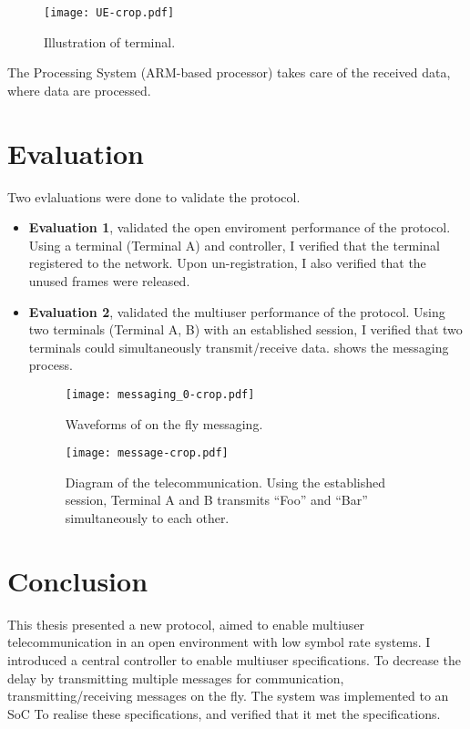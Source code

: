 ﻿\documentclass[twocolumn,9pt]{ltjsarticle}
\renewcommand{\ref}{\Cref}
\begin{document}
\begin{figure}[tb]
  \centering
  \texttt{[image: UE-crop.pdf]}
  \caption{\label{fig:terminal}
    Illustration of terminal.
  }
\end{figure}

The Processing System (ARM\textregistered -based processor) takes care of the received data, where data are processed.

\section{Evaluation}
Two evlaluations were done to validate the protocol.
\begin{itemize}
\item \textbf{Evaluation 1}, validated the open enviroment performance of the protocol.
  Using a terminal (Terminal A) and controller, I verified that the terminal registered to the network.
  Upon un-registration, I also verified that the unused frames were released.
\item \textbf{Evaluation 2}, validated the multiuser performance of the protocol.
  Using two terminals (Terminal A, B) with an established session, I verified that two terminals could simultaneously transmit/receive data.
  \ref{fig:message} shows the messaging process.

    \begin{figure*}[!tb]
      \centering
      \texttt{[image: messaging\_0-crop.pdf]}
      \caption{\label{fig:messaging}
        Waveforms of on the fly messaging.
      }
    \end{figure*}    
  
    \begin{figure}[tb]
    \centering
    \texttt{[image: message-crop.pdf]}
    \caption{\label{fig:message}
      Diagram of the telecommunication.
      Using the established session, Terminal A and B transmits ``Foo'' and ``Bar'' simultaneously to each other.
    }
    \end{figure}
\end{itemize}

\section{Conclusion}
This thesis presented a new protocol, aimed to enable multiuser telecommunication in an open environment with low symbol rate systems.
I introduced a central controller to enable multiuser specifications.
To decrease the delay by transmitting multiple messages for communication, transmitting/receiving messages on the fly.
 The system was implemented to an SoC To realise these specifications, and verified that it met the specifications.
\end{document}

